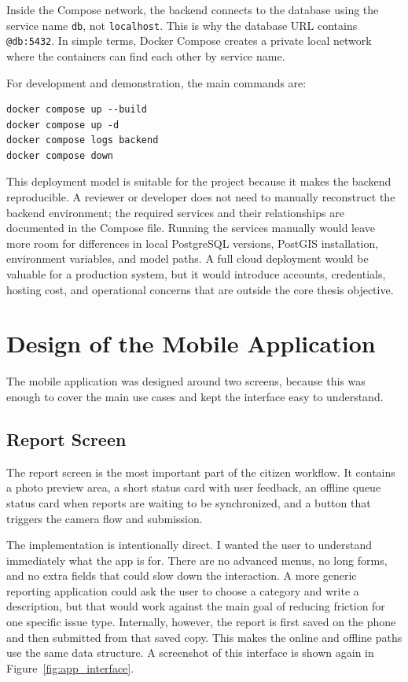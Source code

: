 Inside the Compose network, the backend connects to the database using the service name \texttt{db}, not \texttt{localhost}. This is why the database URL contains \texttt{@db:5432}. In simple terms, Docker Compose creates a private local network where the containers can find each other by service name.

For development and demonstration, the main commands are:

\begin{verbatim}
docker compose up --build
docker compose up -d
docker compose logs backend
docker compose down
\end{verbatim}

This deployment model is suitable for the project because it makes the backend reproducible. A reviewer or developer does not need to manually reconstruct the backend environment; the required services and their relationships are documented in the Compose file. Running the services manually would leave more room for differences in local PostgreSQL versions, PostGIS installation, environment variables, and model paths. A full cloud deployment would be valuable for a production system, but it would introduce accounts, credentials, hosting cost, and operational concerns that are outside the core thesis objective.

\section{Design of the Mobile Application}

The mobile application was designed around two screens, because this was enough to cover the main use cases and kept the interface easy to understand.

\subsection{Report Screen}

The report screen is the most important part of the citizen workflow. It contains a photo preview area, a short status card with user feedback, an offline queue status card when reports are waiting to be synchronized, and a button that triggers the camera flow and submission.

The implementation is intentionally direct. I wanted the user to understand immediately what the app is for. There are no advanced menus, no long forms, and no extra fields that could slow down the interaction. A more generic reporting application could ask the user to choose a category and write a description, but that would work against the main goal of reducing friction for one specific issue type. Internally, however, the report is first saved on the phone and then submitted from that saved copy. This makes the online and offline paths use the same data structure. A screenshot of this interface is shown again in Figure~\ref{fig:app_interface}.

